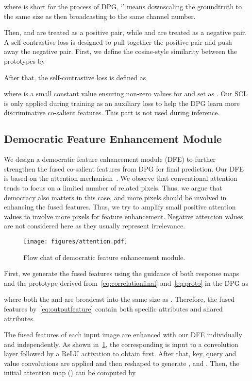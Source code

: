 \documentclass[10pt,twocolumn,letterpaper]{article}
\begin{document}
where  is short for the process of DPG, `' means downscaling the groundtruth  to the same size as  then broadcasting to the same channel number.

Then,  and  are treated as a positive pair, while  and  are treated as a negative pair. A self-contrastive loss is designed to pull together the positive pair and push away the negative pair. First, we define the cosine-style similarity between the prototypes by

After that, the self-contrastive loss is defined as



where  is a small constant value ensuring non-zero values for  and set as . Our SCL is only applied during training as an auxiliary loss to help the DPG learn more discriminative co-salient features. This part is not used during inference.

\subsection{Democratic Feature Enhancement Module}
We design a democratic feature enhancement module (DFE) to further strengthen the fused co-salient features from DPG for final prediction. Our DFE is based on the attention mechanism~\cite{vaswani2017attention}. We observe that conventional attention~\cite{vaswani2017attention} tends to focus on a limited number of related pixels. Thus, we argue that democracy also matters in this case, and more pixels should be involved in enhancing the fused features. Thus, we try to amplify small positive attention values to involve more pixels for feature enhancement. Negative attention values are not considered here as they usually represent irrelevance.
\begin{figure}
\centering
	\texttt{[image: figures/attention.pdf]}
	\caption{Flow chat of democratic feature enhancement module.}
	\label{FIG:attention}
\end{figure}
First, we generate the fused features using the guidance of both response maps and the prototype derived from~\cref{eq:correlationfinal} and~\cref{eq:proto} in the DPG as

where both the  and  are broadcast into the same size as . Therefore, the fused features by~\cref{eq:outputfeature} contain both specific attributes and shared attributes.

The fused features of each input image are enhanced with our DFE individually and independently. As shown in~\cref{FIG:attention}, the corresponding  is input to a  convolution layer followed by a ReLU activation to obtain  first. After that, key, query and value convolutions are applied and then reshaped to generate ,  and . Then, the initial attention map () can be computed by 
\end{document}
